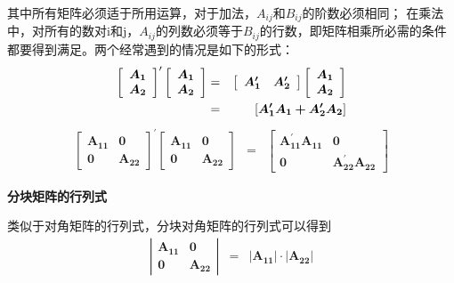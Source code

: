 \begin{enumerate} [1、]
		其中所有矩阵必须适于所用运算，对于加法，$ A_{ij} $和$ B_{ij} $的阶数必须相同；
		在乘法中，对所有的数对i和j，$ A_{ij} $的列数必须等于$ B_{ij} $的行数，即矩阵相乘所必需的条件都要得到满足。两个经常遇到的情况是如下的形式：
		\begin{eqnarray}
		\left[\begin{array}{c}
			\boldsymbol{A_{1}} \\
			\boldsymbol{A_{2}}
		\end{array}\right]^{\prime}\left[\begin{array}{c}
			\boldsymbol{A_{1}} \\
			\boldsymbol{A_{2}}
		\end{array}\right]  & = & \left[\begin{array}{cc}
			\boldsymbol{A_{1}^{\prime}} & \boldsymbol{A_{2}^{\prime}}
		\end{array}\right]\left[\begin{array}{c}
			\boldsymbol{A_{1}} \\
			\boldsymbol{A_{2}}
		\end{array}\right] \\
		& = & \left[ \boldsymbol{ A_{1}^{\prime} A_{1}+A_{2}^{\prime} A_{2} }\right] \notag
		\end{eqnarray}
		\begin{eqnarray}
		\left[\begin{array}{cc}
			\boldsymbol{A_{11}} & \boldsymbol{0} \\
			\boldsymbol{0} & \boldsymbol{A_{22}}
		\end{array}\right]^{\prime}\left[\begin{array}{cc} 
			\boldsymbol{A_{11}} & \boldsymbol{0} \\
			\boldsymbol{0} & \boldsymbol{A_{22}}
		\end{array}\right] & = & \left[
			\begin{array}{cc}
				\boldsymbol{A_{11}^{\prime} A_{11} } & \boldsymbol{0} \\
				\boldsymbol{0} & \boldsymbol{A_{22}^{\prime} A_{22}}
			\end{array}\right] 
		\end{eqnarray}
		
		{\bf 分块矩阵的行列式}
		
		类似于对角矩阵的行列式，分块对角矩阵的行列式可以得到
		\begin{eqnarray}
		\left|\begin{array}{ll}
			\boldsymbol{A_{11}} & \boldsymbol{0} \\
			\boldsymbol{0} & \boldsymbol{A_{22}}
		\end{array}\right| & = & \left| \boldsymbol{ A_{11} }\right| \cdot\left| \boldsymbol{A_{22}} \right|
		\end{eqnarray}
		

\end{enumerate}
